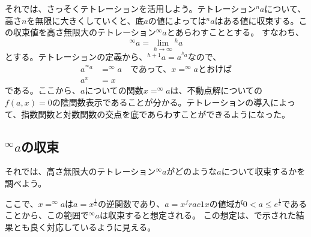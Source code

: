 	それでは、さっそくテトレーションを活用しよう。テトレーション$^n a$について、高さ$n$を無限に大きくしていくと、底$a$の値によっては$^n a$はある値に収束する。この収束値を高さ無限大のテトレーション$^\infty a$とあらわすこととする。
	すなわち、
	\begin{equation*}
		^\infty a = \lim_{h \to \infty} {^h a}
	\end{equation*}
	とする。テトレーションの定義から、$^{h+1} a = a^{^h a}$なので、
	\begin{align*}
		a ^{^\infty a} &= ^\infty a \quad \text{であって、$x = ^\infty a$とおけば} \\
		a^x &= x
	\end{align*}
	である。ここから、$a$についての関数$x = ^\infty a$は、不動点解についての$f(a,x) = 0$の陰関数表示であることが分かる。テトレーションの導入によって、指数関数と対数関数の交点を底であらわすことができるようになった。
	
\subsection{$^\infty a$の収束}
	それでは、高さ無限大のテトレーション$^\infty a$がどのような$a$について収束するかを調べよう。
	
	ここで、$x = ^\infty a$は$a = x^\frac{1}{x}$の逆関数であり、$a = x^frac{1}{x}$の値域が$0 < a \leq e^\frac{1}{e}$であることから、この範囲で$^\infty a$は収束すると想定される。
	この想定は、で示された結果とも良く対応しているように見える。
	
